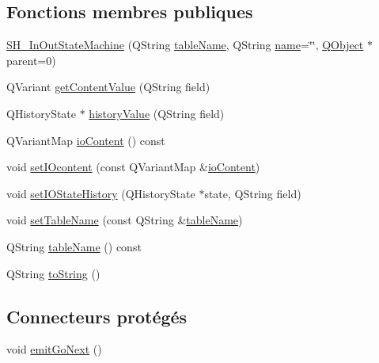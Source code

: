 \subsection*{Fonctions membres publiques}
\begin{DoxyCompactItemize}
\item 
\hyperlink{classSH__InOutStateMachine_abd780037922920c674b43d80c2b50d16}{S\-H\-\_\-\-In\-Out\-State\-Machine} (Q\-String \hyperlink{classSH__InOutStateMachine_a4288a6c86ddf83effefff886675591c9}{table\-Name}, Q\-String \hyperlink{classSH__NamedObject_a9f686c6f2a5bcc08ad03d0cee0151f0f}{name}=\char`\"{}\char`\"{}, \hyperlink{classQObject}{Q\-Object} $\ast$parent=0)
\item 
Q\-Variant \hyperlink{classSH__InOutStateMachine_aa1a3bd3c0ea8a59b9bc916dc718eb9ca}{get\-Content\-Value} (Q\-String field)
\item 
Q\-History\-State $\ast$ \hyperlink{classSH__InOutStateMachine_af71bfdb3b59b7bf2763588b513b4205f}{history\-Value} (Q\-String field)
\item 
Q\-Variant\-Map \hyperlink{classSH__InOutStateMachine_aaca105fbd5f5cc3bac115389ad3694c5}{io\-Content} () const 
\item 
void \hyperlink{classSH__InOutStateMachine_a8271a7ec7d5f6502449dd3b4da5f4155}{set\-I\-Ocontent} (const Q\-Variant\-Map \&\hyperlink{classSH__InOutStateMachine_aaca105fbd5f5cc3bac115389ad3694c5}{io\-Content})
\item 
void \hyperlink{classSH__InOutStateMachine_acbcce2c4300af1634d928b30e5e9be1c}{set\-I\-O\-State\-History} (Q\-History\-State $\ast$state, Q\-String field)
\item 
void \hyperlink{classSH__InOutStateMachine_a95db31a7e7f31f36a8737adc739ab08c}{set\-Table\-Name} (const Q\-String \&\hyperlink{classSH__InOutStateMachine_a4288a6c86ddf83effefff886675591c9}{table\-Name})
\item 
Q\-String \hyperlink{classSH__InOutStateMachine_a4288a6c86ddf83effefff886675591c9}{table\-Name} () const 
\item 
Q\-String \hyperlink{classSH__GenericStateMachine_a85c0c1c9d258ae991f84667412fa47cd}{to\-String} ()
\end{DoxyCompactItemize}
\subsection*{Connecteurs protégés}
\begin{DoxyCompactItemize}
\item 
void \hyperlink{classSH__GenericStateMachine_a2e162a1da1f694d433cb9072b37ac530}{emit\-Go\-Next} ()
\end{DoxyCompactItemize}
